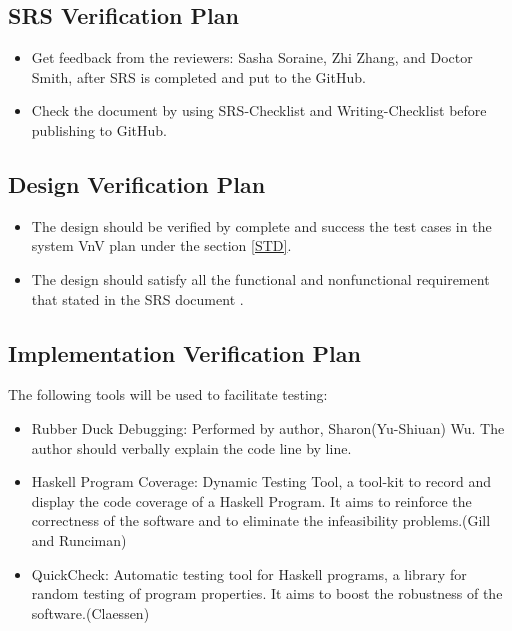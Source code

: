 \documentclass[12pt, titlepage]{article}
\begin{document}
\subsection{SRS Verification Plan}

\begin{itemize}

\item Get feedback from the reviewers: Sasha Soraine, Zhi Zhang, and Doctor
Smith, after SRS is completed and put to the GitHub.
\item Check the document by using SRS-Checklist and Writing-Checklist before
publishing to GitHub.

\end{itemize}


\subsection{Design Verification Plan}
\begin{itemize}

\item The design should be verified by complete and success the test cases in
the system VnV plan under the section \ref{STD}.
\item The design should satisfy all the functional and nonfunctional
requirement that stated in the SRS document \cite{YS2019}.

\end{itemize}


\label{Planfordv}

\subsection{Implementation Verification Plan} 
The following tools will be used to facilitate testing: 

\begin{itemize}
\item[ ]Rubber Duck Debugging: Performed by author, Sharon(Yu-Shiuan) Wu. The 
author should verbally explain the code line by line.
\item[ ]Haskell Program Coverage: Dynamic Testing Tool, a tool-kit to record 
and display the code coverage of a Haskell Program. It aims to reinforce the 
correctness of the software and to eliminate the infeasibility problems.(Gill
and Runciman\cite{GillandRunciman})
\item[ ]QuickCheck: Automatic testing tool for Haskell programs, a library for
random testing of program properties. It aims to boost the robustness of the 
software.(Claessen\cite{QuickCheck})
		
\end{itemize} 
\end{document}
